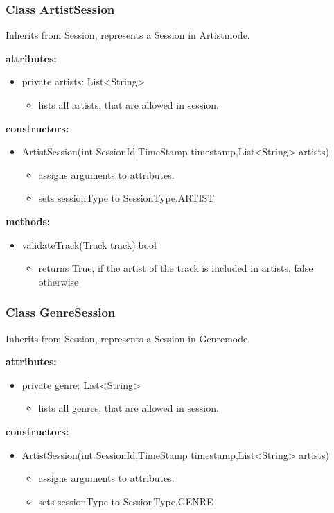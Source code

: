 \documentclass[oneside, nenglish]{sdqtechreport}
\begin{document}
\subsubsection{Class ArtistSession}
Inherits from Session, represents a Session in Artistmode.

\textbf{attributes:}
\begin{itemize}
    \item private artists: List<String>
    \begin{itemize}
        \item lists all artists, that are allowed in session.
    \end{itemize}
\end{itemize}
\textbf{constructors:}
\begin{itemize}
    \item ArtistSession(int SessionId,TimeStamp timestamp,List<String> artists)
    \begin{itemize}
        \item assigns arguments to attributes.
        \item sets sessionType to SessionType.ARTIST
    \end{itemize}
\end{itemize}

\textbf{methods:}
\begin{itemize}
    \item validateTrack(Track track):bool
    \begin{itemize}
        \item returns True, if the artist of the track is included in artists, false otherwise
    \end{itemize}
\end{itemize}

\subsubsection{Class GenreSession}
Inherits from Session, represents a Session in Genremode.

\textbf{attributes:}
\begin{itemize}
    \item private genre: List<String>
    \begin{itemize}
        \item lists all genres, that are allowed in session.
    \end{itemize}
\end{itemize}
\textbf{constructors:}
\begin{itemize}
    \item ArtistSession(int SessionId,TimeStamp timestamp,List<String> artists)
    \begin{itemize}
        \item assigns arguments to attributes.
        \item sets sessionType to SessionType.GENRE
    \end{itemize}
\end{itemize}
\end{document}
